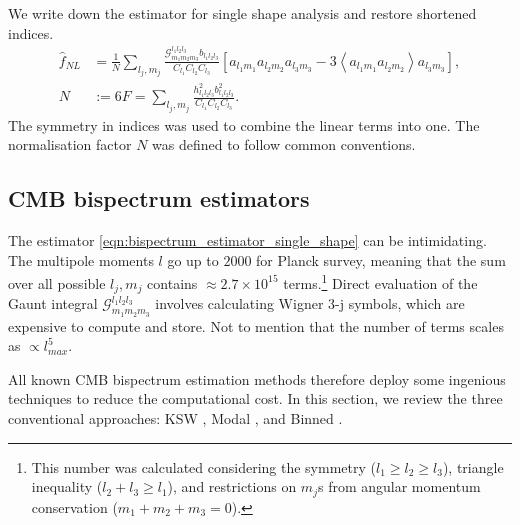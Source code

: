 We write down the estimator for single shape analysis and restore shortened indices.
\begin{align}
	\hat{f}_{NL} &= \frac{1}{N} \sum_{l_j,m_j} \frac{\mathcal{G}^{l_1 l_2 l_3}_{m_1 m_2 m_3} b_{l_1 l_2 l_3}}{C_{l_1} C_{l_2} C_{l_3}} \left[ a_{l_1 m_1} a_{l_2 m_2} a_{l_3 m_3} - 3\left< a_{l_1 m_1} a_{l_2 m_2} \right> a_{l_3 m_3} \right], \label{eqn:bispectrum_estimator_single_shape} \\
	N &:= 6F = \sum_{l_j,m_j} \frac{h^2_{l_1 l_2 l_3} b^2_{l_1 l_2 l_3}}{C_{l_1} C_{l_2} C_{l_3}}. \label{eqn:bispectrum_estimator_normalisation_single_shape}
\end{align}
The symmetry in indices was used to combine the linear terms into one. The normalisation factor $N$ was defined to follow common conventions. 

\subsection{CMB bispectrum estimators}
The estimator \eqref{eqn:bispectrum_estimator_single_shape} can be intimidating. The multipole moments $l$ go up to $2000$ for Planck survey, meaning that the sum over all possible $l_j, m_j$ contains $\approx 2.7\times 10^{15}$ terms.\footnote{This number was calculated considering the symmetry ($l_1 \ge l_2 \ge l_3$), triangle inequality ($l_2+l_3 \ge l_1$), and restrictions on $m_j$s from angular momentum conservation ($m_1+m_2+m_3=0$). } Direct evaluation of the Gaunt integral $\mathcal{G}^{l_1 l_2 l_3}_{m_1 m_2 m_3}$ involves calculating Wigner 3-j symbols, which are expensive to compute and store. Not to mention that the number of terms scales as $\propto l_{max}^5$.

All known CMB bispectrum estimation methods therefore deploy some ingenious techniques to reduce the computational cost. In this section, we review the three conventional approaches: KSW \cite{Komatsu2005,Creminelli2006limits}, Modal \cite{Fergusson2010general,Fergusson2012}, and Binned \cite{Bucher2010}.

